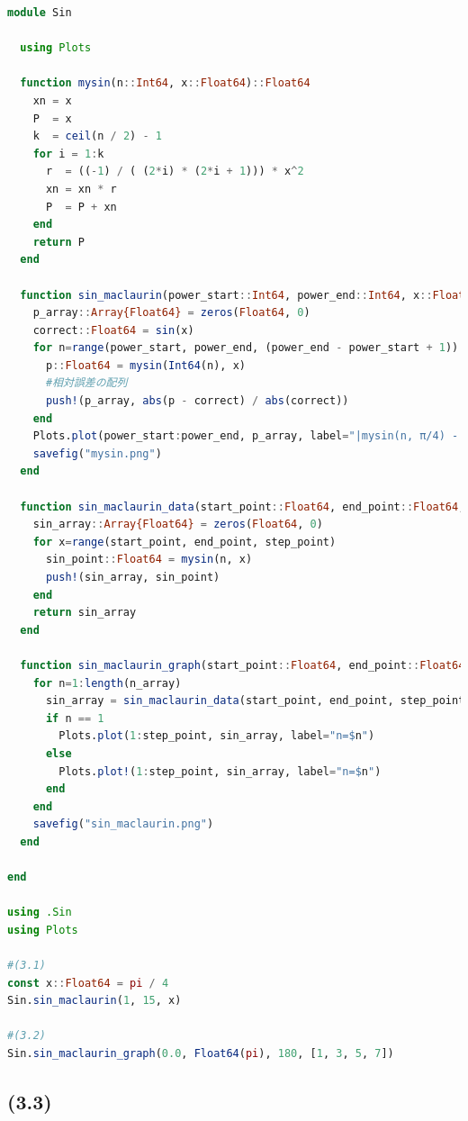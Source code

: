 \documentclass[uplatex, dvipdfmx, a4j,11pt]{jsarticle}
\begin{document}
\begin{lstlisting}[title={(2-3)}, label=code:in, language=Julia]
  module Sin

  using Plots

  function mysin(n::Int64, x::Float64)::Float64
    xn = x
    P  = x
    k  = ceil(n / 2) - 1
    for i = 1:k
      r  = ((-1) / ( (2*i) * (2*i + 1))) * x^2
      xn = xn * r
      P  = P + xn
    end
    return P
  end

  function sin_maclaurin(power_start::Int64, power_end::Int64, x::Float64)
    p_array::Array{Float64} = zeros(Float64, 0)
    correct::Float64 = sin(x)
    for n=range(power_start, power_end, (power_end - power_start + 1))
      p::Float64 = mysin(Int64(n), x)
      #相対誤差の配列
      push!(p_array, abs(p - correct) / abs(correct))
    end
    Plots.plot(power_start:power_end, p_array, label="|mysin(n, π/4) - sin(π/4)| / |sin(π/4)|")
    savefig("mysin.png")
  end

  function sin_maclaurin_data(start_point::Float64, end_point::Float64, step_point::Int64, n::Int64)::Array{Float64}
    sin_array::Array{Float64} = zeros(Float64, 0)
    for x=range(start_point, end_point, step_point)
      sin_point::Float64 = mysin(n, x)
      push!(sin_array, sin_point)
    end
    return sin_array
  end

  function sin_maclaurin_graph(start_point::Float64, end_point::Float64, step_point::Int64, n_array::Array{Int64})
    for n=1:length(n_array)
      sin_array = sin_maclaurin_data(start_point, end_point, step_point, n_array[n])
      if n == 1
        Plots.plot(1:step_point, sin_array, label="n=$n")
      else
        Plots.plot!(1:step_point, sin_array, label="n=$n")
      end
    end
    savefig("sin_maclaurin.png")
  end

end

using .Sin
using Plots

#(3.1)
const x::Float64 = pi / 4
Sin.sin_maclaurin(1, 15, x)

#(3.2)
Sin.sin_maclaurin_graph(0.0, Float64(pi), 180, [1, 3, 5, 7])
\end{lstlisting}
\subsection*{(3.3)}
\end{document}
